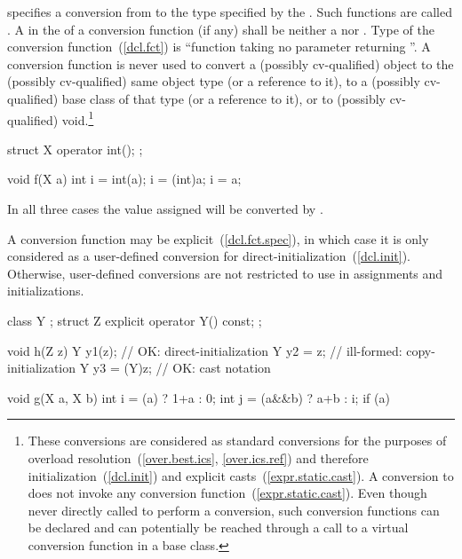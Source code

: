 specifies a conversion from
to the type specified by the
.
Such functions are called .
A  in the 
of a conversion function (if any) shall be neither
a  nor .
%
Type of the conversion function~(\ref{dcl.fct}) is
``function taking no parameter returning
''.
A conversion function is never used to convert a (possibly cv-qualified) object
to the (possibly cv-qualified) same object type (or a reference to it),
to a (possibly cv-qualified) base class of that type (or a reference to it),
or to (possibly cv-qualified) void.\footnote{These conversions are considered
as standard conversions for the purposes of overload resolution~(\ref{over.best.ics}, \ref{over.ics.ref}) and therefore initialization~(\ref{dcl.init}) and explicit casts~(\ref{expr.static.cast}). A conversion to  does not invoke any conversion function~(\ref{expr.static.cast}).
Even though never directly called to perform a conversion,
such conversion functions can be declared and can potentially
be reached through a call to a virtual conversion function in a base class.}

\enterexample

\begin{codeblock}
struct X {
  operator int();
};

void f(X a) {
  int i = int(a);
  i = (int)a;
  i = a;
}
\end{codeblock}

In all three cases the value assigned will be converted by
.
\exitexample

\pnum
A conversion function may be explicit~(\ref{dcl.fct.spec}), in which case it is only considered as a user-defined conversion for direct-initialization~(\ref{dcl.init}). Otherwise, user-defined conversions are not restricted to use in assignments and initializations.
\enterexample

\begin{codeblock}
class Y { };
struct Z {
  explicit operator Y() const;
};

void h(Z z) {
  Y y1(z);          // OK: direct-initialization
  Y y2 = z;         // ill-formed: copy-initialization
  Y y3 = (Y)z;      // OK: cast notation
}

void g(X a, X b) {
  int i = (a) ? 1+a : 0;
  int j = (a&&b) ? a+b : i;
  if (a) {
  }
}
\end{codeblock}
\exitexample

